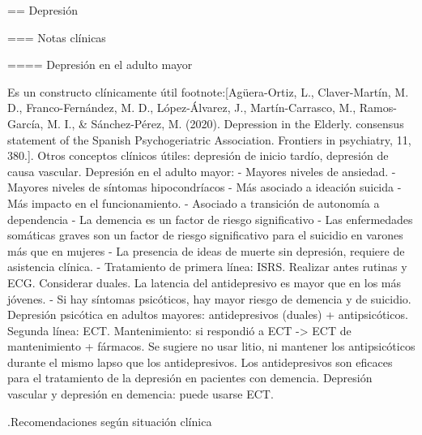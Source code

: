 \documentclass[encares.tex]{subfiles}
\begin{document}
== Depresión

=== Notas clínicas

==== Depresión en el adulto mayor

Es un constructo clínicamente útil footnote:[Agüera-Ortiz, L., Claver-Martín, M. D., Franco-Fernández, M. D., López-Álvarez, J., Martín-Carrasco, M., Ramos-García, M. I., \& Sánchez-Pérez, M. (2020). Depression in the Elderly. consensus statement of the Spanish Psychogeriatric Association. Frontiers in psychiatry, 11, 380.].
Otros conceptos clínicos útiles: depresión de inicio tardío, depresión de causa vascular.
Depresión en el adulto mayor:
- Mayores niveles de ansiedad.
- Mayores niveles de síntomas hipocondríacos
- Más asociado a ideación suicida
- Más impacto en el funcionamiento.
- Asociado a transición de autonomía a dependencia
- La demencia es un factor de riesgo significativo
- Las enfermedades somáticas graves son un factor de riesgo significativo para el suicidio en varones más que en mujeres
- La presencia de ideas de muerte sin depresión, requiere de asistencia clínica.
- Tratamiento de primera línea: ISRS. Realizar antes rutinas y ECG. Considerar duales. La latencia del antidepresivo es mayor que en los más jóvenes.
- Si hay síntomas psicóticos, hay mayor riesgo de demencia y de suicidio.
Depresión psicótica en adultos mayores: antidepresivos (duales) + antipsicóticos. Segunda línea: ECT. Mantenimiento: si respondió a ECT -> ECT de mantenimiento + fármacos. Se sugiere no usar litio, ni mantener los antipsicóticos durante el mismo lapso que los antidepresivos.
Los antidepresivos son eficaces para el tratamiento de la depresión en pacientes con demencia.
Depresión vascular y depresión en demencia: puede usarse ECT.

.Recomendaciones según situación clínica
\end{document}
